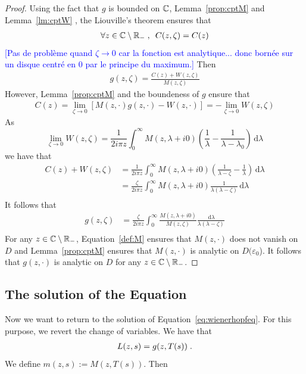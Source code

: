 \documentclass[11pt]{amsart}
\newcommand{\diff}{\,\mathrm{d}}
\newcommand{\ndr}[1]{\textcolor{blue}{[#1]}}
\begin{document}
\begin{proof}
Using the fact that $g$ is bounded on $\mathbb{C}$, Lemma~\ref{prop:cptM} and Lemma~\ref{lm:cptW}
, the Liouville's theorem ensures that
\begin{align*}
    \forall z \in \mathbb{C} \setminus \mathbb{R}_-
    \; , \enspace
    C(z,\zeta) = C(z)
\end{align*}
\ndr{Pas de problème quand $\zeta\to 0$ car la fonction est analytique... donc bornée sur un disque centré en $0$ par le principe du maximum.}
Then 
\begin{align}
    g(z,\zeta) = \frac{C(z)+W(z,\zeta)}{M(z,\zeta)}
\end{align}
However, Lemma~\ref{prop:cptM} and the boundeness of $g$ ensure that
\begin{align}
C(z) 
= \lim_{\zeta \to 0}[M(z,\cdot)g(z,\cdot) - W(z,\cdot)] 
= -\lim_{\zeta \to 0}W(z,\zeta)
\end{align}
As
$$ \lim_{\zeta \to 0}W(z,\zeta) 
= \frac{1}{2i\pi z}\int_0^\infty  {M(z,\lambda+i0)}\left( \frac{1}{\lambda} - \frac{1}{\lambda-\lambda_0}\right) \diff \lambda $$
we have that
\begin{align*}
    C(z) + W(z,\zeta)
    &= 
    \frac{1}{2i \pi z}\int_0^\infty  {M(z,\lambda+i0)}\left( \frac{1}{\lambda-\zeta}-\frac{1}{\lambda}\right) \diff \lambda \\
    &= 
    \frac{\zeta}{2i\pi z}\int_0^\infty  {M(z,\lambda+i0)}\frac{1}{\lambda(\lambda-\zeta)} \diff \lambda \\
\end{align*}
It follows that 
\begin{align*}
    g(z,\zeta) 
    &= 
    \frac{\zeta}{2i \pi z}\int_0^\infty  \frac{M(z,\lambda+i0)}{M(z,\zeta)} \frac{\diff \lambda}{\lambda(\lambda-\zeta)} \\
\end{align*}
For any $z \in \mathbb{C} \setminus \mathbb{R}_-$, Equation~\eqref{def:M} ensures that $M(z, \cdot)$ does not vanish on $D$ and Lemma~\ref{prop:cptM} ensures that $M(z, \cdot)$ is analytic on $D(\varepsilon_0$). It follows that $g(z, \cdot)$ is analytic on $D$ for any $z \in \mathbb{C} \setminus \mathbb{R}_-$.

\end{proof}

\subsection{The solution of the Equation}
Now we want to return to the solution of Equation~\eqref{eq:wienerhopfeq}. For this purpose, we revert the change of variables. We have that 
\begin{align}
    L(z,s) = g(z, T(s)) 
    \; .
\end{align}
We define $m(z,s) := M(z, T(s))$. Then
\end{document}
